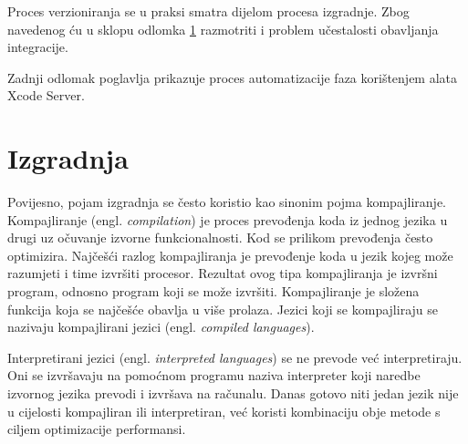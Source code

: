\documentclass[times, utf8, diplomski, numeric]{fer}
\newcommand{\eng}[1]{(engl. \textit{#1})}
\begin{document}
Proces verzioniranja se u praksi smatra dijelom procesa izgradnje. Zbog navedenog ću u sklopu odlomka \ref{Izgradnja} razmotriti i problem učestalosti obavljanja integracije.

Zadnji odlomak poglavlja prikazuje proces automatizacije faza korištenjem alata Xcode Server.

\section{Izgradnja} \label{Izgradnja}

Povijesno, pojam izgradnja se često koristio kao sinonim pojma kompajliranje. Kompajliranje \eng{compilation} je proces prevođenja koda iz jednog jezika u drugi uz očuvanje izvorne funkcionalnosti. Kod se prilikom prevođenja često optimizira. Najčešći razlog kompajliranja je prevođenje koda u jezik kojeg može razumjeti i time izvršiti procesor. Rezultat ovog tipa kompajliranja je izvršni program, odnosno program koji se može izvršiti. Kompajliranje je složena funkcija koja se najčešće obavlja u više prolaza. Jezici koji se kompajliraju se nazivaju kompajlirani jezici \eng{compiled languages}.

Interpretirani jezici \eng{interpreted languages} se ne prevode već interpretiraju. Oni se izvršavaju na pomoćnom programu naziva interpreter koji naredbe izvornog jezika prevodi i izvršava na računalu. Danas gotovo niti jedan jezik nije u cijelosti kompajliran ili interpretiran, već koristi kombinaciju obje metode s ciljem optimizacije performansi.
\end{document}
